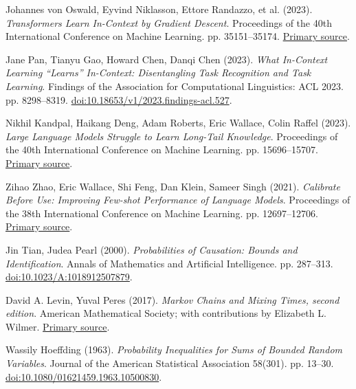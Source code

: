 Johannes von Oswald, Eyvind Niklasson, Ettore Randazzo, et al. (2023). \textit{Transformers Learn In-Context by Gradient Descent}. Proceedings of the 40th International Conference on Machine Learning. pp. 35151--35174.
\href{https://proceedings.mlr.press/v202/von-oswald23a.html}{Primary source}.

Jane Pan, Tianyu Gao, Howard Chen, Danqi Chen (2023). \textit{What In-Context Learning ``Learns'' In-Context: Disentangling Task Recognition and Task Learning}. Findings of the Association for Computational Linguistics: ACL 2023. pp. 8298--8319.
\href{https://aclanthology.org/2023.findings-acl.527/}{doi:10.18653/v1/2023.findings-acl.527}.

Nikhil Kandpal, Haikang Deng, Adam Roberts, Eric Wallace, Colin Raffel (2023). \textit{Large Language Models Struggle to Learn Long-Tail Knowledge}. Proceedings of the 40th International Conference on Machine Learning. pp. 15696--15707.
\href{https://proceedings.mlr.press/v202/kandpal23a.html}{Primary source}.

Zihao Zhao, Eric Wallace, Shi Feng, Dan Klein, Sameer Singh (2021). \textit{Calibrate Before Use: Improving Few-shot Performance of Language Models}. Proceedings of the 38th International Conference on Machine Learning. pp. 12697--12706.
\href{https://proceedings.mlr.press/v139/zhao21c.html}{Primary source}.

Jin Tian, Judea Pearl (2000). \textit{Probabilities of Causation: Bounds and Identification}. Annals of Mathematics and Artificial Intelligence. pp. 287--313.
\href{https://ftp.cs.ucla.edu/pub/stat_ser/r271-A.pdf}{doi:10.1023/A:1018912507879}.

David A. Levin, Yuval Peres (2017). \textit{Markov Chains and Mixing Times, second edition}. American Mathematical Society; with contributions by Elizabeth L. Wilmer.
\href{https://pages.uoregon.edu/dlevin/MARKOV/markovmixing.pdf}{Primary source}.

Wassily Hoeffding (1963). \textit{Probability Inequalities for Sums of Bounded Random Variables}. Journal of the American Statistical Association 58(301). pp. 13--30.
\href{https://doi.org/10.1080/01621459.1963.10500830}{doi:10.1080/01621459.1963.10500830}.
